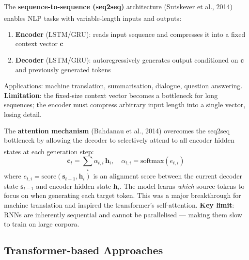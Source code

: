 \begin{tcbitemize}[ skin=sectionraster ]
    \tcbitem[title={Seq2Seq: Encoder-Decoder for NLP}, raster multicolumn=3]
    The \textbf{sequence-to-sequence (seq2seq)} architecture (Sutskever et al., 2014) enables NLP tasks with variable-length inputs and outputs\textsuperscript{\cite[][p.~8]{dhamaniIntroductionGenerativeAI2024}}:
    \begin{enumerate}
        \item \textbf{Encoder} (LSTM/GRU): reads input sequence and compresses it into a fixed context vector $\mathbf{c}$
        \item \textbf{Decoder} (LSTM/GRU): autoregressively generates output conditioned on $\mathbf{c}$ and previously generated tokens
    \end{enumerate}
    Applications: machine translation, summarisation, dialogue, question answering.
    \textbf{Limitation}: the fixed-size context vector becomes a bottleneck for long sequences; the encoder must compress arbitrary input length into a single vector, losing detail.

    \tcbitem[title={Attention in RNNs}, raster multicolumn=3]
    The \textbf{attention mechanism} (Bahdanau et al., 2014) overcomes the seq2seq bottleneck by allowing the decoder to selectively attend to all encoder hidden states at each generation step\textsuperscript{\cite[][p.~8]{dhamaniIntroductionGenerativeAI2024}}:
    \begin{equation}
        \mathbf{c}_t = \sum_{i} \alpha_{t,i}\, \mathbf{h}_i, \quad \alpha_{t,i} = \mathrm{softmax}(e_{t,i})
    \end{equation}
    where $e_{t,i} = \mathrm{score}(\mathbf{s}_{t-1}, \mathbf{h}_i)$ is an alignment score between the current decoder state $\mathbf{s}_{t-1}$ and encoder hidden state $\mathbf{h}_i$.
    The model learns \emph{which} source tokens to focus on when generating each target token.
    This was a major breakthrough for machine translation and inspired the transformer's self-attention.
    \textbf{Key limit}: RNNs are inherently sequential and cannot be parallelised --- making them slow to train on large corpora.
\end{tcbitemize}

\subsection{Transformer-based Approaches}

